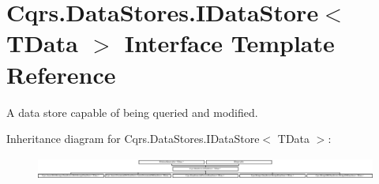 \hypertarget{interfaceCqrs_1_1DataStores_1_1IDataStore}{}\section{Cqrs.\+Data\+Stores.\+I\+Data\+Store$<$ T\+Data $>$ Interface Template Reference}
\label{interfaceCqrs_1_1DataStores_1_1IDataStore}


A data store capable of being queried and modified.  


Inheritance diagram for Cqrs.\+Data\+Stores.\+I\+Data\+Store$<$ T\+Data $>$\+:\begin{figure}[H]
\begin{center}
\leavevmode
\includegraphics[height=0.748330cm]{interfaceCqrs_1_1DataStores_1_1IDataStore}
\end{center}
\end{figure}
